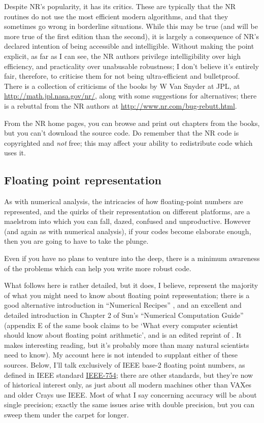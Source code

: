 \documentclass[11pt,oneside,chapters]{starlink}
\begin{document}
Despite NR's popularity, it has its critics.  These are
typically that the NR routines do not use the most
efficient modern algorithms, and that they sometimes go
wrong in borderline situations.  While this may be true
(and will be more true of the first edition than the
second), it is largely a consequence of NR's declared
intention of being accessible and intelligible.  Without
making the point explicit, as far as I can see, the NR
authors privilege intelligibility over high efficiency,
and practicality over unabusable robustness; I don't
believe it's entirely fair, therefore, to criticise them
for not being ultra-efficient and bulletproof.  There is a
collection of criticisms of the books by W Van Snyder at
JPL, at \url{http://math.jpl.nasa.gov/nr/}, along
with some suggestions for alternatives; there is a
rebuttal from the NR authors at
\url{http://www.nr.com/bug-rebutt.html}.

From the NR home pages, you can browse and print out
chapters from the books, but you can't download the source
code.  Do remember that the NR code is copyrighted and
\emph{not} free; this may affect your ability to
redistribute code which uses it.

\subsection{Floating point representation}
\label{s:fp}

As with numerical analysis, the intricacies of how
floating-point numbers are represented, and the quirks of
their representation on different platforms, are a
maelstrom into which you can fall, dazed, confused and
unproductive.  However (and again as with numerical
analysis), if your codes become elaborate enough, then you
are going to have to take the plunge.

Even if you have no plans to venture into the deep, there
is a minimum awareness of the problems which can help you
write more robust code.

What follows here is rather detailed, but it does, I
believe, represent the majority of what you might need to
know about floating point representation; there is a good
alternative introduction in ``Numerical Recipes''
\citep{nr}, and an excellent and detailed
introduction in Chapter 2 of Sun's ``Numerical
Computation Guide'' \citep{sunncg}
(appendix E of the same book claims to be `What every
computer scientist should know about floating point
arithmetic', and is an edited reprint of
\citet{goldberg91}.  It makes interesting
reading, but it's probably more than many natural
scientists need to know).  My account here is not intended
to supplant either of these sources.  Below, I'll talk
exclusively of IEEE base-2 floating point numbers, as
defined in IEEE standard
\href{http://grouper.ieee.org/groups/754/}{IEEE-754};
there are other standards, but they're now of historical
interest only, as just about all modern machines other
than VAXes and older Crays use IEEE.  Most of what I say
concerning accuracy will be about single precision;
exactly the same issues arise with double precision, but
you can sweep them under the carpet for longer.
\end{document}
